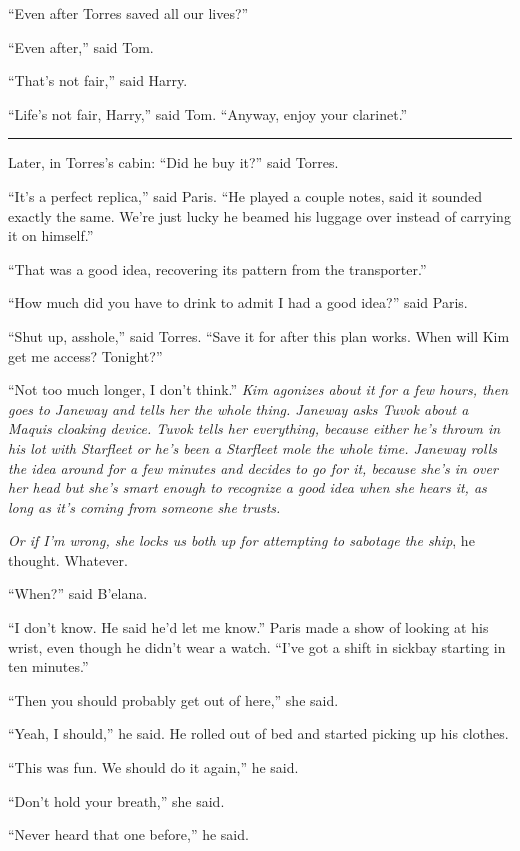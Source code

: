 \documentclass[twoside,letterpaper,12pt]{memoir}
\begin{document}
``Even after Torres saved all our lives?'' 

``Even after,'' said Tom. 

``That's not fair,'' said Harry. 

``Life's not fair, Harry,'' said Tom. ``Anyway, enjoy your clarinet.'' 

\fancybreak{\rule{3cm}{0.4 pt}} 

Later, in Torres's cabin: ``Did he buy it?'' said Torres. 

``It's a perfect replica,'' said Paris. ``He played a couple notes, said it sounded exactly the same. We're just lucky he beamed his luggage over instead of carrying it on himself.''

``That was a good idea, recovering its pattern from the transporter.'' 

``How much did you have to drink to admit I had a good idea?'' said Paris. 

``Shut up, asshole,'' said Torres. ``Save it for after this plan works. When will Kim get me access? Tonight?'' 

``Not too much longer, I don't think.'' \textit{Kim agonizes about it for a few hours, then goes to Janeway and tells her the whole thing. Janeway asks Tuvok about a Maquis cloaking device. Tuvok tells her everything, because either he's thrown in his lot with Starfleet or he's been a Starfleet mole the whole time. Janeway rolls the idea around for a few minutes and decides to go for it, because she's in over her head but she's smart enough to recognize a good idea when she hears it, as long as it's coming from someone she trusts.} 

\textit{Or if I'm wrong, she locks us both up for attempting to sabotage the ship}, he thought. Whatever. 

``When?'' said B'elana. 

``I don't know. He said he'd let me know.'' Paris made a show of looking at his wrist, even though he didn't wear a watch. ``I've got a shift in sickbay starting in ten minutes.'' 

``Then you should probably get out of here,'' she said. 

``Yeah, I should,'' he said. He rolled out of bed and started picking up his clothes. 

``This was fun. We should do it again,'' he said. 

``Don't hold your breath,'' she said. 

``Never heard that one before,'' he said. 
\end{document}
